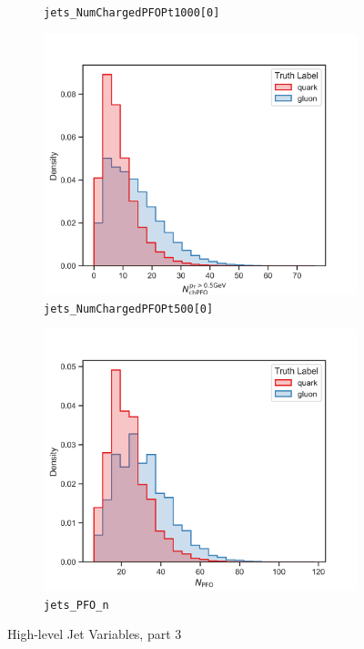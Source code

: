 \begin{figure}[!htb]
\begin{subfigure}[t]{0.49\textwidth}
		\caption{\texttt{jets\_NumChargedPFOPt1000[0]}}
		\label{fig:highlevel_15}
	\end{subfigure}
	\begin{subfigure}[t]{0.49\textwidth}
		\includegraphics[width=1\textwidth]{src/plots/distributions/highlevel/jets_NumChargedPFOPt500[0].png}
		\caption{\texttt{jets\_NumChargedPFOPt500[0]}}
		\label{fig:highlevel_16}
	\end{subfigure}
	\begin{subfigure}[t]{0.49\textwidth}
		\includegraphics[width=1\textwidth]{src/plots/distributions/highlevel/jets_PFO_n.png}
		\caption{\texttt{jets\_PFO\_n}}
		\label{fig:highlevel_17}
	\end{subfigure}
\caption{High-level Jet Variables, part 3}
\label{fig:highlevel_12-17}
\end{figure}

